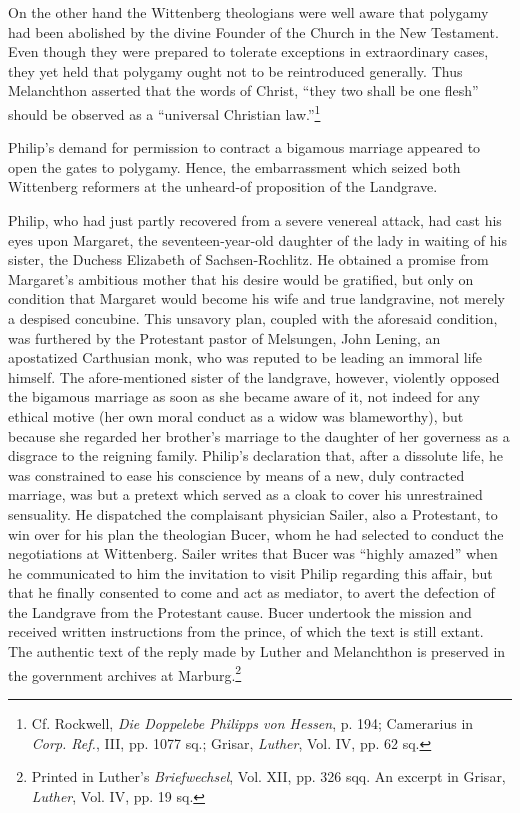 On the other hand the Wittenberg theologians were well aware
that polygamy had been abolished by the divine Founder of the
Church in the New Testament. Even though they were prepared to
tolerate exceptions in extraordinary cases, they yet held that polygamy
ought not to be reintroduced generally. Thus Melanchthon asserted
that the words of Christ, “they two shall be one flesh” should
be observed as a “universal Christian law.”\footnote
{Cf. Rockwell, \textit{Die Doppelebe Philipps von Hessen}, p. 194; Camerarius in \textit{Corp. Ref.},
III, pp. 1077 sq.; Grisar, \textit{Luther}, Vol. IV, pp. 62 sq.}

Philip’s demand for permission to contract a bigamous marriage
appeared to open the gates to polygamy. Hence, the embarrassment
which seized both Wittenberg reformers at the unheard-of proposition of
the Landgrave.

Philip, who had just partly recovered from a severe venereal attack, had
cast his eyes upon Margaret, the seventeen-year-old
daughter of the lady in waiting of his sister, the Duchess Elizabeth
of Sachsen-Rochlitz. He obtained a promise from Margaret’s ambitious mother
that his desire would be gratified, but only on condition
that Margaret would become his wife and true landgravine, not
merely a despised concubine. This unsavory plan, coupled with the
aforesaid condition, was furthered by the Protestant pastor of Melsungen,
John Lening, an apostatized Carthusian monk, who was
reputed to be leading an immoral life himself. The afore-mentioned
sister of the landgrave, however, violently opposed the bigamous
marriage as soon as she became aware of it, not indeed for any ethical
motive (her own moral conduct as a widow was blameworthy), but
because she regarded her brother’s marriage to the daughter of her
governess as a disgrace to the reigning family. Philip’s declaration
that, after a dissolute life, he was constrained to ease his conscience by
means of a new, duly contracted marriage, was but a pretext which
served as a cloak to cover his unrestrained sensuality. He dispatched
the complaisant physician Sailer, also a Protestant, to win over for
his plan the theologian Bucer, whom he had selected to conduct the
negotiations at Wittenberg. Sailer writes that Bucer was “highly
amazed” when he communicated to him the invitation to visit Philip
regarding this affair, but that he finally consented to come and act
as mediator, to avert the defection of the Landgrave from the Protestant
cause. Bucer undertook the mission and received written instructions
from the prince, of which the text is still extant. The authentic
text of the reply made by Luther and Melanchthon is preserved in
the government archives at Marburg.\footnote
{Printed in Luther’s \textit{Briefwechsel}, Vol. XII, pp. 326 sqq. An excerpt in Grisar, \textit{Luther},
Vol. IV, pp. 19 sq.}


